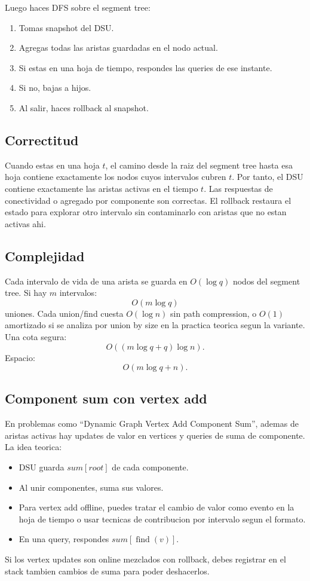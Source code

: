 \documentclass[10pt]{article}
\newcommand{\bigO}{O}
\newcommand{\find}{\operatorname{find}}
\begin{document}
Luego haces DFS sobre el segment tree:
\begin{enumerate}[leftmargin=*]
\item Tomas snapshot del DSU.
\item Agregas todas las aristas guardadas en el nodo actual.
\item Si estas en una hoja de tiempo, respondes las queries de ese instante.
\item Si no, bajas a hijos.
\item Al salir, haces rollback al snapshot.
\end{enumerate}

\subsection{Correctitud}
Cuando estas en una hoja $t$, el camino desde la raiz del segment tree hasta esa
hoja contiene exactamente los nodos cuyos intervalos cubren $t$. Por tanto, el
DSU contiene exactamente las aristas activas en el tiempo $t$. Las respuestas de
conectividad o agregado por componente son correctas. El rollback restaura el
estado para explorar otro intervalo sin contaminarlo con aristas que no estan
activas ahi.

\subsection{Complejidad}
Cada intervalo de vida de una arista se guarda en $\bigO(\log q)$ nodos del
segment tree. Si hay $m$ intervalos:
\[
\bigO(m\log q)
\]
uniones. Cada union/find cuesta $\bigO(\log n)$ sin path compression, o
$\bigO(1)$ amortizado si se analiza por union by size en la practica teorica
segun la variante. Una cota segura:
\[
\bigO((m\log q+q)\log n).
\]
Espacio:
\[
\bigO(m\log q+n).
\]

\subsection{Component sum con vertex add}
En problemas como ``Dynamic Graph Vertex Add Component Sum'', ademas de aristas
activas hay updates de valor en vertices y queries de suma de componente.
La idea teorica:
\begin{itemize}[leftmargin=*]
\item DSU guarda $sum[root]$ de cada componente.
\item Al unir componentes, suma sus valores.
\item Para vertex add offline, puedes tratar el cambio de valor como evento en
la hoja de tiempo o usar tecnicas de contribucion por intervalo segun el
formato.
\item En una query, respondes $sum[\find(v)]$.
\end{itemize}
Si los vertex updates son online mezclados con rollback, debes registrar en el
stack tambien cambios de suma para poder deshacerlos.
\end{document}

